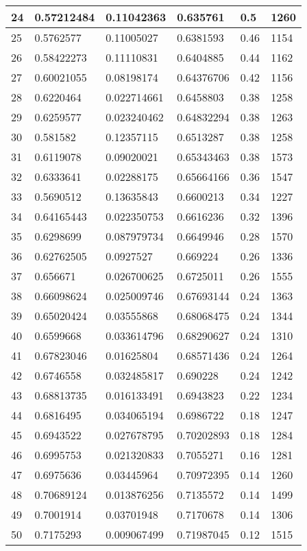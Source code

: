 \begin{longtable}{|l|l|l|l|l|l|}
24 & 0.57212484 & 0.11042363 & 0.635761 & 0.5 & 1260 \\ \hline 
25 & 0.5762577 & 0.11005027 & 0.6381593 & 0.46 & 1154 \\ \hline 
26 & 0.58422273 & 0.11110831 & 0.6404885 & 0.44 & 1162 \\ \hline 
27 & 0.60021055 & 0.08198174 & 0.64376706 & 0.42 & 1156 \\ \hline 
28 & 0.6220464 & 0.022714661 & 0.6458803 & 0.38 & 1258 \\ \hline 
29 & 0.6259577 & 0.023240462 & 0.64832294 & 0.38 & 1263 \\ \hline 
30 & 0.581582 & 0.12357115 & 0.6513287 & 0.38 & 1258 \\ \hline 
31 & 0.6119078 & 0.09020021 & 0.65343463 & 0.38 & 1573 \\ \hline 
32 & 0.6333641 & 0.02288175 & 0.65664166 & 0.36 & 1547 \\ \hline 
33 & 0.5690512 & 0.13635843 & 0.6600213 & 0.34 & 1227 \\ \hline 
34 & 0.64165443 & 0.022350753 & 0.6616236 & 0.32 & 1396 \\ \hline 
35 & 0.6298699 & 0.087979734 & 0.6649946 & 0.28 & 1570 \\ \hline 
36 & 0.62762505 & 0.0927527 & 0.669224 & 0.26 & 1336 \\ \hline 
37 & 0.656671 & 0.026700625 & 0.6725011 & 0.26 & 1555 \\ \hline 
38 & 0.66098624 & 0.025009746 & 0.67693144 & 0.24 & 1363 \\ \hline 
39 & 0.65020424 & 0.03555868 & 0.68068475 & 0.24 & 1344 \\ \hline 
40 & 0.6599668 & 0.033614796 & 0.68290627 & 0.24 & 1310 \\ \hline 
41 & 0.67823046 & 0.01625804 & 0.68571436 & 0.24 & 1264 \\ \hline 
42 & 0.6746558 & 0.032485817 & 0.690228 & 0.24 & 1242 \\ \hline 
43 & 0.68813735 & 0.016133491 & 0.6943823 & 0.22 & 1234 \\ \hline 
44 & 0.6816495 & 0.034065194 & 0.6986722 & 0.18 & 1247 \\ \hline 
45 & 0.6943522 & 0.027678795 & 0.70202893 & 0.18 & 1284 \\ \hline 
46 & 0.6995753 & 0.021320833 & 0.7055271 & 0.16 & 1281 \\ \hline 
47 & 0.6975636 & 0.03445964 & 0.70972395 & 0.14 & 1260 \\ \hline 
48 & 0.70689124 & 0.013876256 & 0.7135572 & 0.14 & 1499 \\ \hline 
49 & 0.7001914 & 0.03701948 & 0.7170678 & 0.14 & 1306 \\ \hline 
50 & 0.7175293 & 0.009067499 & 0.71987045 & 0.12 & 1515 \\ \hline 
\end{longtable}